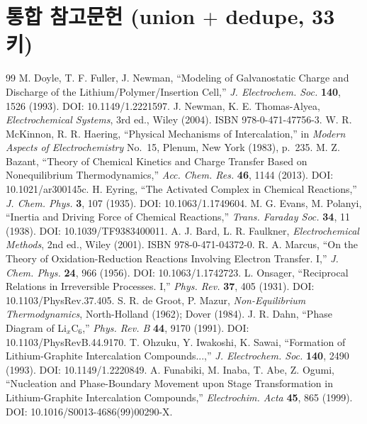 \documentclass[11pt,a4paper]{article}
\begin{document}
\section{통합 참고문헌 (union $+$ dedupe, 33 키)}\label{sec:refs_bib}
\begin{thebibliography}{99}
 M. Doyle, T. F. Fuller, J. Newman, ``Modeling of Galvanostatic Charge and Discharge
  of the Lithium/Polymer/Insertion Cell,'' \emph{J. Electrochem. Soc.} \textbf{140}, 1526 (1993).
  DOI: 10.1149/1.2221597.
 J. Newman, K. E. Thomas-Alyea, \emph{Electrochemical Systems}, 3rd ed., Wiley (2004).
  ISBN 978-0-471-47756-3.
 W. R. McKinnon, R. R. Haering, ``Physical Mechanisms of Intercalation,'' in
  \emph{Modern Aspects of Electrochemistry} No.~15, Plenum, New York (1983), p.~235.
 M. Z. Bazant, ``Theory of Chemical Kinetics and Charge Transfer Based on
  Nonequilibrium Thermodynamics,'' \emph{Acc. Chem. Res.} \textbf{46}, 1144 (2013).
  DOI: 10.1021/ar300145c.
 H. Eyring, ``The Activated Complex in Chemical Reactions,'' \emph{J. Chem. Phys.}
  \textbf{3}, 107 (1935). DOI: 10.1063/1.1749604.
 M. G. Evans, M. Polanyi, ``Inertia and Driving Force of Chemical Reactions,''
  \emph{Trans. Faraday Soc.} \textbf{34}, 11 (1938). DOI: 10.1039/TF9383400011.
 A. J. Bard, L. R. Faulkner, \emph{Electrochemical Methods}, 2nd ed., Wiley (2001).
  ISBN 978-0-471-04372-0.
 R. A. Marcus, ``On the Theory of Oxidation-Reduction Reactions Involving Electron
  Transfer. I,'' \emph{J. Chem. Phys.} \textbf{24}, 966 (1956). DOI: 10.1063/1.1742723.
 L. Onsager, ``Reciprocal Relations in Irreversible Processes. I,'' \emph{Phys. Rev.}
  \textbf{37}, 405 (1931). DOI: 10.1103/PhysRev.37.405.
 S. R. de Groot, P. Mazur, \emph{Non-Equilibrium Thermodynamics},
  North-Holland (1962); Dover (1984).
 J. R. Dahn, ``Phase Diagram of Li$_x$C$_6$,'' \emph{Phys. Rev. B} \textbf{44}, 9170
  (1991). DOI: 10.1103/PhysRevB.44.9170.
 T. Ohzuku, Y. Iwakoshi, K. Sawai, ``Formation of Lithium-Graphite Intercalation
  Compounds...,'' \emph{J. Electrochem. Soc.} \textbf{140}, 2490 (1993). DOI: 10.1149/1.2220849.
 A. Funabiki, M. Inaba, T. Abe, Z. Ogumi, ``Nucleation and Phase-Boundary
  Movement upon Stage Transformation in Lithium-Graphite Intercalation Compounds,''
  \emph{Electrochim. Acta} \textbf{45}, 865 (1999). DOI: 10.1016/S0013-4686(99)00290-X.

\end{thebibliography}
\end{document}
